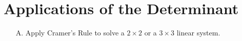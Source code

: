\section{Applications of the Determinant}

\begin{outcome}
\begin{enumerate}

\item[A.] Apply Cramer's Rule to solve a $2\times 2$ or a $3\times 3$ linear
system.


\end{enumerate}
\end{outcome}
